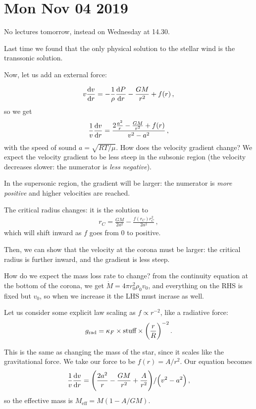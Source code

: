 \documentclass[main.tex]{subfiles}
\begin{document}
\section*{Mon Nov 04 2019}

No lectures tomorrow, instead on Wednesday at 14.30.

Last time we found that the only physical solution to the stellar wind is the transsonic solution.

Now, let us add an external force:

%
\begin{align}
  v \dv{v}{r} = - \frac{1}{\rho } \dv{P}{r} - \frac{GM}{r^2} + f(r)
\,,
\end{align}
%
so we get 
%
\begin{align}
  \frac{1}{v} \dv{v}{r} = \frac{2 \frac{a^2}{r} - \frac{GM}{r^2} + f(r)}{v^2 - a^2}
\,,
\end{align}
%
with the speed of sound \(a = \sqrt{RT / \mu } \). How does the velocity gradient change?
We expect the velocity gradient to be less steep in the subsonic region (the velocity decreases slower: the numerator is \emph{less negative}).

In the supersonic region, the gradient will be larger: the numerator is \emph{more positive} and higher velocities are reached.

The critical radius changes: it is the solution to 
%
\begin{align}
  r_C = \frac{GM}{2 a^2} - \frac{f(r_C) r_C^2}{2 a^2}
\,,
\end{align}
%
which will shift inward as \(f\) goes from 0 to positive.

Then, we can show that the velocity at the corona must be larger: the critical radius is further inward, and the gradient is less steep.

How do we expect the mass loss rate to change? from the continuity equation at the bottom of the corona, we get \(\dot{M} = 4 \pi r_0^2 \rho_0 v_0 \), and everything on the RHS is fixed but \(v_0 \), so when we increase it the LHS must incrase as well.

Let us consider some explicit law scaling as \(f \propto r^{-2}\), like a radiative force: 
%
\begin{align}
  g _{\text{rad}} = \kappa_F \times \text{stuff} \times \qty(\frac{r}{R})^{-2}
\,.
\end{align}

This is the same as changing the mass of the star, since it scales like the gravitational force. We take our force to be \(f(r) = A / r^2\). Our equation becomes 
%
\begin{align}
  \frac{1}{v} \dv{v}{r}  = \qty(\frac{2 a^2}{r} - \frac{GM}{r^2} + \frac{A}{r^2}) / \qty(v^2- a^2)
\,,
\end{align}
%
so the effective mass is \(M _{\text{eff}} = M ( 1- A / GM)\).
\end{document}
